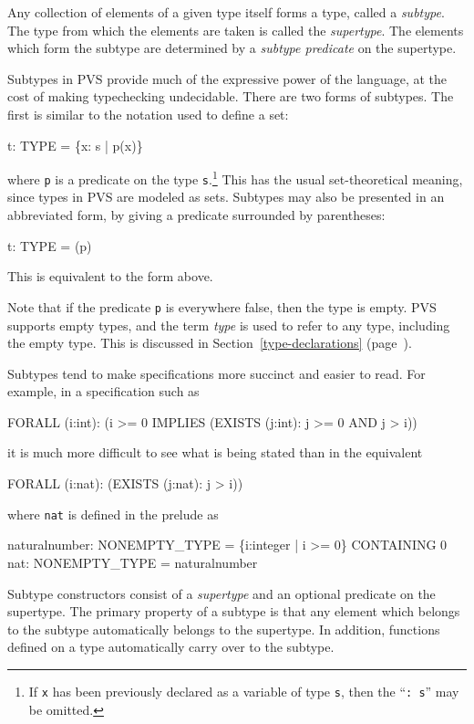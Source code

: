 Any collection of elements of a given type itself forms a type, called a
\emph{subtype}.  The type from which the elements are taken is called the
\emph{supertype}.  The elements which form the subtype
are determined by a \emph{subtype predicate} on
the supertype.

Subtypes in PVS provide much of the expressive power of the language,
at the cost of making typechecking undecidable.  There are two forms of
subtypes.  The first is similar to the notation used to define a set:
\begin{pvsex}
  t: TYPE = \{x: s | p(x)\}
\end{pvsex}
%
where {\tt p} is a predicate on the type {\tt s}.\footnote{If {\tt x}
has been previously declared as a variable of type {\tt s}, then the
``{\tt :~s}'' may be omitted.} This has the usual set-theoretical
meaning, since types in PVS are modeled as sets.  Subtypes may also
be presented in an abbreviated form, by giving a predicate surrounded by
parentheses:
\begin{pvsex}
  t: TYPE = (p)
\end{pvsex}
%
This is equivalent to the form above.

Note that if the predicate \texttt{p} is everywhere false, then the type
is empty.  PVS supports empty types,
and the term \emph{type} is used to refer to any type, including the empty
type.  This is discussed in Section~\ref{type-declarations} (page~\pageref{type-declarations}).

Subtypes tend to make specifications more succinct and easier to read.
For example, in a specification such as
\begin{pvsex}
  FORALL (i:int):
    (i >= 0 IMPLIES (EXISTS (j:int): j >= 0 AND j > i))
\end{pvsex}
it is much more difficult to see what is being stated than in the
equivalent
\begin{pvsex}
  FORALL (i:nat): (EXISTS (j:nat): j > i))
\end{pvsex}
%
where {\tt nat} is defined in the prelude as
\begin{pvsex}
  naturalnumber: NONEMPTY\_TYPE = \{i:integer | i >= 0\} CONTAINING 0
  nat: NONEMPTY\_TYPE = naturalnumber
\end{pvsex}

Subtype constructors consist of a \emph{supertype} and
an optional predicate on the supertype.  The primary property of a
subtype is that any element which belongs to the subtype automatically
belongs to the supertype.  In addition, functions defined on a type
automatically carry over to the subtype.

